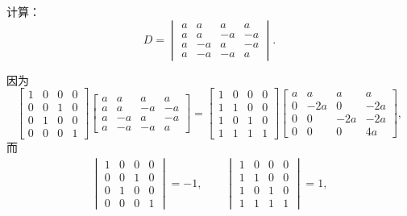 \begin{example}
计算：\begin{equation*}
	D = \begin{vmatrix}
		a & a & a & a \\
		a & a & -a & -a \\
		a & -a & a & -a \\
		a & -a & -a & a
	\end{vmatrix}.
\end{equation*}
\begin{solution}
因为\begin{equation*}
	\begin{bmatrix}
		1 & 0 & 0 & 0 \\
		0 & 0 & 1 & 0 \\
		0 & 1 & 0 & 0 \\
		0 & 0 & 0 & 1
	\end{bmatrix} \begin{bmatrix}
		a & a & a & a \\
		a & a & -a & -a \\
		a & -a & a & -a \\
		a & -a & -a & a
	\end{bmatrix}
	= \begin{bmatrix}
		1 & 0 & 0 & 0 \\
		1 & 1 & 0 & 0 \\
		1 & 0 & 1 & 0 \\
		1 & 1 & 1 & 1
	\end{bmatrix} \begin{bmatrix}
		a & a & a & a \\
		0 & -2 a & 0 & -2 a \\
		0 & 0 & -2 a & -2 a \\
		0 & 0 & 0 & 4 a
	\end{bmatrix},
\end{equation*}
而\begin{gather*}
	\begin{vmatrix}
		1 & 0 & 0 & 0 \\
		0 & 0 & 1 & 0 \\
		0 & 1 & 0 & 0 \\
		0 & 0 & 0 & 1
	\end{vmatrix} = -1,
	\qquad
	\begin{vmatrix}
		1 & 0 & 0 & 0 \\
		1 & 1 & 0 & 0 \\
		1 & 0 & 1 & 0 \\
		1 & 1 & 1 & 1
	\end{vmatrix} = 1, \\

\end{gather*}
\end{solution}
\end{example}
